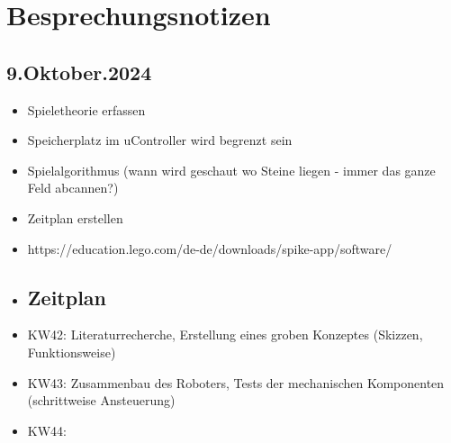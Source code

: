\chapter*{Besprechungsnotizen}

\section{9.Oktober.2024}

\begin{itemize}
	\item Spieletheorie erfassen
	\item Speicherplatz im uController wird begrenzt sein
	\item Spielalgorithmus (wann wird geschaut wo Steine liegen - immer das ganze Feld abcannen?)
	\item Zeitplan erstellen
	\item  https://education.lego.com/de-de/downloads/spike-app/software/
	\item 
	\section*{Zeitplan}
	\item KW42: Literaturrecherche, Erstellung eines groben Konzeptes (Skizzen, Funktionsweise)
	\item KW43: Zusammenbau des Roboters, Tests der mechanischen Komponenten (schrittweise Ansteuerung)
	\item KW44: 
	
\end{itemize}
